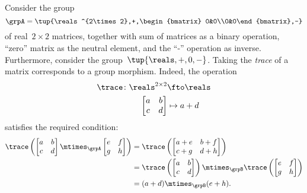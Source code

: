 \begin{example}
  Consider the group
  \begin{equation}
    \grpA=\tup{\reals^{2\times 2},+,\begin{bmatrix} 0&0\\0&0\end{bmatrix},-}
  \end{equation} of real~$2\times 2$ matrices, together with sum of matrices as a binary operation, ``zero'' matrix as the neutral element, and the ``-'' operation as inverse.
  Furthermore, consider the group~$\tup{\reals,+,0,-}$. Taking the \emph{trace} of a matrix corresponds to a group morphism. Indeed, the operation
  \begin{equation*}
    \begin{aligned}
   \trace\colon \reals^{2\times 2}&\fto \reals\\
    \begin{bmatrix}
      a&b\\
      c&d
  \end{bmatrix}&\mapsto a+d
  \end{aligned}
  \end{equation*}
  satisfies the required condition:
  \begin{equation*}
    \begin{aligned}
      \trace \left(\begin{bmatrix}
      a&b\\
      c&d
  \end{bmatrix} \mtimes_\grpA \begin{bmatrix}
      e&f\\
      g&h
  \end{bmatrix} \right)&=\trace \left( \begin{bmatrix}
      a+e&b+f\\
      c+g&d+h
  \end{bmatrix}\right)\\
      &=\trace \left( \begin{bmatrix}
      a&b\\
      c&d
  \end{bmatrix}\right)\mtimes_\grpB \trace \left( \begin{bmatrix}
      e&f\\
      g&h
  \end{bmatrix}\right)\\
      &=(a+d)\mtimes_\grpB (e+h).
    \end{aligned}
  \end{equation*}
\end{example}
